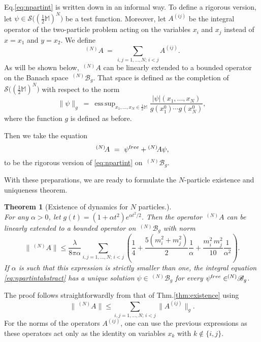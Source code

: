 \documentclass[b5paper,draft,openbib,12pt]{memoir}
\newtheorem{Thm}[Def]{Theorem}
\newcommand{\M}{\mathbb{M}}
\newcommand{\free}{{\textup free}}
\newcommand{\Banach}{\mathscr{B}}
\DeclareMathOperator*{\esssup}{ess \, sup}
\begin{document}
Eq.\@ \eqref{eq:npartint} is written down in an 
informal way. To define a rigorous version, let 
$\psi \in \mathcal{S}\big( (\tfrac{1}{2}\M)^N\big)$ 
be a test function. Moreover, let $A^{(ij)}$ be the 
integral operator of the two-particle problem acting 
on the variables $x_i$ and $x_j$ instead of $x = x_1$ 
and $y=x_2$. We define
\begin{equation}
	\,^{(N)}\! A ~=~ \sum_{i,j =1,...,N; \, i<j} A^{(ij)}.
\end{equation}
As will be shown below, $\! \,^{(N)}\! A$ can be 
linearly extended to a bounded operator on the Banach 
space $\! \,^{(N)}\Banach_g$. That space is defined 
as the completion of $\mathcal{S}\big( 
  (\tfrac{1}{2}\M)^N\big)$ with respect to the norm
\begin{equation}
	\|\psi \|_g ~=~ \esssup_{x_1,...,x_N \in \frac{1}{2}\M} \frac{|\psi|(x_1,...,x_N)}{g(x_1^0)\cdots g(x_N^0)},
\end{equation}
where the function $g$ is defined as before.

Then we take the equation
\begin{equation}
	\,^{(N)}\! A ~=~\psi^\free + \! \,^{(N)}\! A \psi,
\label{eq:npartintabstract}
\end{equation}
to be the rigorous version of \eqref{eq:npartint} on 
$\! \,^{(N)}\!\Banach_g$.

With these preparations, we are ready to formulate 
the $N$-particle existence and uniqueness theorem.

\begin{Thm}[Existence of dynamics for $N$ particles.]
	\label{thm:Npart}~\\
    For any $\alpha > 0$, let $g(t) = (1+\alpha t^2)
    e^{\alpha t^2/2}$. Then the operator $\! \,^{(N)}\! A$ 
    can be linearly extended to a bounded operator on 
    $\! \,^{(N)} \Banach_g$ with norm
	\begin{equation}
    \|\! \,^{(N)}\! A\| \leq\frac{\lambda}{8\pi \alpha}\! \sum_{i,j =1,...,N; \, i<j} \! 
    \left( \frac{1}{4} \!+\! \frac{5(m_i^2 + m_j^2)}{2} \frac{1}{\alpha} 
    \!+ \!\frac{m_i^2 \, m_j^2}{10} \frac{1}{\alpha^2} \right).
	\end{equation}
  If $\alpha$ is such that this expression is 
  strictly smaller than one, the integral equation 
  \eqref{eq:npartintabstract} has a unique solution 
  $\psi \in \!\!\! \,^{(N)}\Banach_g$ for every 
  $\psi^\free \in \!\!\! \,^{(N)}\Banach_g$.
\end{Thm}

The proof follows straightforwardly from that of 
Thm.\@ \ref{thm:existence} using
\begin{equation}
	\|\! \,^{(N)}\! A\| \leq \sum_{i,j =1,...,N; \, i<j} \| A^{(ij)}\|_g.
\end{equation}
For the norms of the operators $A^{(ij)}$, one can 
use the previous expressions as these operators act 
only as the identity on variables $x_k$ with 
$k \notin \{i,j\}$.
\end{document}

